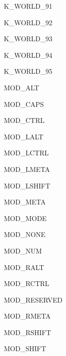 \begin{datadesc}{K_WORLD_91}
\end{datadesc}
\begin{datadesc}{K_WORLD_92}
\end{datadesc}
\begin{datadesc}{K_WORLD_93}
\end{datadesc}
\begin{datadesc}{K_WORLD_94}
\end{datadesc}
\begin{datadesc}{K_WORLD_95}
\end{datadesc}
\begin{datadesc}{MOD_ALT}
\end{datadesc}
\begin{datadesc}{MOD_CAPS}
\end{datadesc}
\begin{datadesc}{MOD_CTRL}
\end{datadesc}
\begin{datadesc}{MOD_LALT}
\end{datadesc}
\begin{datadesc}{MOD_LCTRL}
\end{datadesc}
\begin{datadesc}{MOD_LMETA}
\end{datadesc}
\begin{datadesc}{MOD_LSHIFT}
\end{datadesc}
\begin{datadesc}{MOD_META}
\end{datadesc}
\begin{datadesc}{MOD_MODE}
\end{datadesc}
\begin{datadesc}{MOD_NONE}
\end{datadesc}
\begin{datadesc}{MOD_NUM}
\end{datadesc}
\begin{datadesc}{MOD_RALT}
\end{datadesc}
\begin{datadesc}{MOD_RCTRL}
\end{datadesc}
\begin{datadesc}{MOD_RESERVED}
\end{datadesc}
\begin{datadesc}{MOD_RMETA}
\end{datadesc}
\begin{datadesc}{MOD_RSHIFT}
\end{datadesc}
\begin{datadesc}{MOD_SHIFT}
\end{datadesc}
